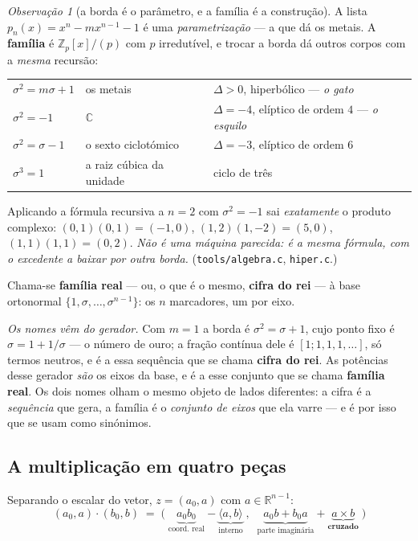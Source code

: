 \documentclass[11pt]{article}
\newcommand{\code}[1]{\texttt{\small #1}}
\newcommand{\Z}{\mathbb Z}
\newcommand{\R}{\mathbb R}
\newcommand{\C}{\mathbb C}
\theoremstyle{plain}
\theoremstyle{remark}
\newtheorem{obs}{Observação}
\begin{document}
\begin{obs}[a borda é o parâmetro, e a família é a construção]
A lista $p_n(x)=x^n-mx^{n-1}-1$ é uma \emph{parametrização} --- a que dá os metais. A
\textbf{família} é $\Z_p[x]/(p)$ com $p$ irredutível, e trocar a borda dá outros corpos com a
\emph{mesma} recursão:
\begin{center}
\begin{tabular}{lll}
\toprule
$\sigma^2=m\sigma+1$ & os metais & $\Delta>0$, hiperbólico --- \emph{o gato} \\
$\sigma^2=-1$ & $\C$ & $\Delta=-4$, elíptico de ordem $4$ --- \emph{o esquilo} \\
$\sigma^2=\sigma-1$ & o sexto ciclotómico & $\Delta=-3$, elíptico de ordem $6$ \\
$\sigma^3=1$ & a raiz cúbica da unidade & ciclo de três \\
\bottomrule
\end{tabular}
\end{center}
Aplicando a fórmula recursiva a $n=2$ com $\sigma^2=-1$ sai \emph{exatamente} o produto complexo:
$(0,1)(0,1)=(-1,0)$, $(1,2)(1,-2)=(5,0)$, $(1,1)(1,1)=(0,2)$. \emph{Não é uma máquina parecida: é a
mesma fórmula, com o excedente a baixar por outra borda.} (\code{tools/algebra.c}, \code{hiper.c}.)
\end{obs}

\noindent Chama-se \textbf{família real} --- ou, o que é o mesmo, \textbf{cifra do rei} --- à base
ortonormal $\{1,\sigma,\dots,\sigma^{n-1}\}$: os $n$ marcadores, um por eixo.

\emph{Os nomes vêm do gerador.} Com $m=1$ a borda é $\sigma^2=\sigma+1$, cujo ponto fixo é
$\sigma=1+1/\sigma$ --- o número de ouro; a fração contínua dele é $[1;1,1,1,\dots]$, só termos
neutros, e é a essa sequência que se chama \textbf{cifra do rei}. As potências desse gerador
\emph{são} os eixos da base, e é a esse conjunto que se chama \textbf{família real}. Os dois nomes
olham o mesmo objeto de lados diferentes: a cifra é a \emph{sequência} que gera, a família é o
\emph{conjunto de eixos} que ela varre --- e é por isso que se usam como sinónimos.

\subsection{A multiplicação em quatro peças}

Separando o escalar do vetor, $z=(a_0,a)$ com $a\in\R^{n-1}$:
\[
 \boxed{\;(a_0,a)\cdot(b_0,b) \;=\; \bigl(\;
 \underbrace{a_0b_0}_{\text{coord.\ real}}-\underbrace{\langle a,b\rangle}_{\text{interno}}
 \;,\;\;
 \underbrace{a_0b+b_0a}_{\text{parte imaginária}}+\underbrace{a\times b}_{\textbf{cruzado}}
 \;\bigr)\;}
\]
\end{document}
